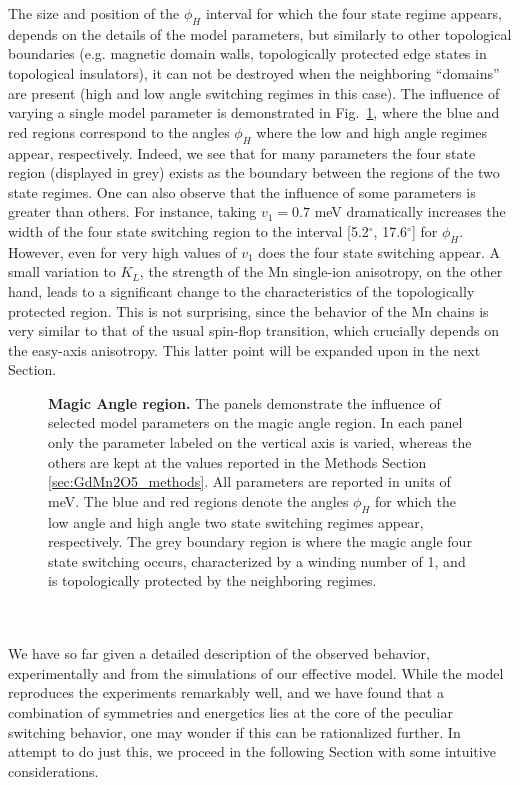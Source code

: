 The size and position of the $\phi_H$ interval for which the four state regime appears, depends on the details of the model parameters, but similarly to other topological boundaries (e.g. magnetic domain walls, topologically protected edge states in topological insulators), it can not be destroyed when the neighboring ``domains'' are present (high and low angle switching regimes in this case).
The influence of varying a single model parameter is demonstrated in Fig.~\ref{fig:GdMn2O5_windingvsparam}, where the blue and red regions correspond to the angles $\phi_H$ where the low and high angle regimes appear, respectively.
Indeed, we see that for many parameters the four state region (displayed in grey) exists as the boundary between the regions of the two state regimes.
One can also observe that the influence of some parameters is greater than others. For instance, taking $v_1=0.7$ meV dramatically increases the width of the four state switching region to the interval [5.2$^\circ$, 17.6$^\circ$] for $\phi_H$.
However, even for very high values of $v_1$ does the four state switching appear.
A small variation to $K_L$, the strength of the Mn single-ion anisotropy, on the other hand, leads to a significant change to the characteristics of the topologically protected region.
This is not surprising, since the behavior of the Mn chains is very similar to that of the usual spin-flop transition, which crucially depends on the easy-axis anisotropy. This latter point will be expanded upon in the next Section.
\begin{figure}
	\caption{\label{fig:GdMn2O5_windingvsparam} {\bf Magic Angle region.} The panels demonstrate the influence of selected model parameters on the magic angle region. In each panel only the parameter labeled on the vertical axis is varied, whereas the others are kept at the values reported in the Methods Section \ref{sec:GdMn2O5_methods}. All parameters are reported in units of meV. The blue and red regions denote the angles $\phi_H$ for which the low angle and high angle two state switching regimes appear, respectively. The grey boundary region is where the magic angle four state switching occurs, characterized by a winding number of 1, and is topologically protected by the neighboring regimes.}
\end{figure}
\\\\
We have so far given a detailed description of the observed behavior, experimentally and from the simulations of our effective model.
While the model reproduces the experiments remarkably well, and we have found that a combination of symmetries and energetics lies at the core of the peculiar switching behavior, one may wonder if this can be rationalized further.
In attempt to do just this, we proceed in the following Section with some intuitive considerations.

